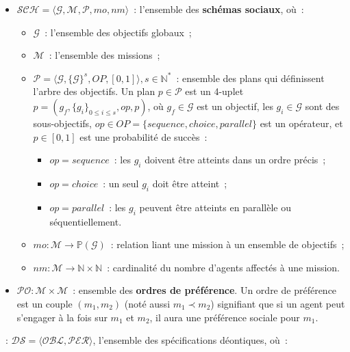 \begin{itemize}
  \item $\mathcal{SCH} = \langle\mathcal{G}, \mathcal{M}, \mathcal{P}, mo, nm \rangle$~: l'ensemble des \textbf{schémas sociaux}, où~:
        \begin{itemize}
          \item $\mathcal{G}$~: l'ensemble des objectifs globaux~;
          \item $\mathcal{M}$~: l'ensemble des missions~;
          \item $\mathcal{P} = \langle \mathcal{G}, \{\mathcal{G}\}^s, OP, [0,1] \rangle, s \in \mathbb{N}^*$~: ensemble des plans qui définissent l'arbre des objectifs.
                Un plan $p \in \mathcal{P}$ est un 4-uplet $p = (g_f, \{g_i\}_{0 \leq i \leq s}, op, p)$, où $g_f \in \mathcal{G}$ est un objectif, les $g_i \in \mathcal{G}$ sont des sous-objectifs, $op \in OP = \{sequence, choice, parallel\}$ est un opérateur, et $p \in [0,1]$ est une probabilité de succès~:
                \begin{itemize}
                  \item $op = sequence$~: les $g_i$ doivent être atteints dans un ordre précis~;
                  \item $op = choice$~: un seul $g_i$ doit être atteint~;
                  \item $op = parallel$~: les $g_i$ peuvent être atteints en parallèle ou séquentiellement.
                \end{itemize}
          \item $mo: \mathcal{M} \rightarrow \mathbb{P}(\mathcal{G})$~: relation liant une mission à un ensemble de objectifs~;
          \item $nm: \mathcal{M} \rightarrow \mathbb{N} \times \mathbb{N}$~: cardinalité du nombre d'agents affectés à une mission.
        \end{itemize}
  \item $\mathcal{PO}: \mathcal{M} \times \mathcal{M}$~: ensemble des \textbf{ordres de préférence}. Un ordre de préférence est un couple $(m_1, m_2)$ (noté aussi $m_1 \prec m_2$) signifiant que si un agent peut s'engager à la fois sur $m_1$ et $m_2$, il aura une préférence sociale pour $m_1$.
\end{itemize}

\medskip

\noindent \textbf{}~: \quad $\mathcal{DS} = \langle \mathcal{OBL}, \mathcal{PER} \rangle$, l'ensemble des spécifications déontiques, où~:

